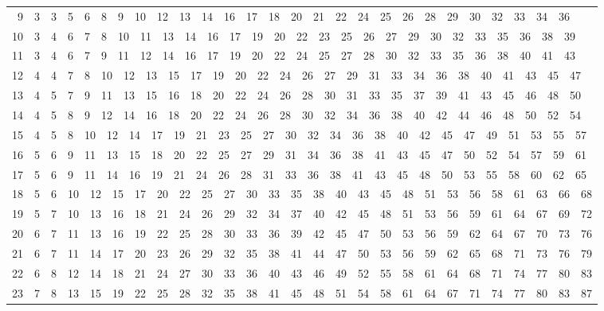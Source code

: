 \documentclass[11pt]{article}
\begin{document}
\begin{center}
\begin{tabular}{r|l}
            9 & 3~~\phantom{0}3~~\phantom{0}5~~\phantom{0}6~~\phantom{0}8~~\phantom{0}9~~10~~12~~13~~14~~16~~17~~18~~20~~21~~22~~24~~25~~26~~28~~29~~30~~32~~33~~34~~36 \\
            10 & 3~~\phantom{0}4~~\phantom{0}6~~\phantom{0}7~~\phantom{0}8~~10~~11~~13~~14~~16~~17~~19~~20~~22~~23~~25~~26~~27~~29~~30~~32~~33~~35~~36~~38~~39 \\
            11 & 3~~\phantom{0}4~~\phantom{0}6~~\phantom{0}7~~\phantom{0}9~~11~~12~~14~~16~~17~~19~~20~~22~~24~~25~~27~~28~~30~~32~~33~~35~~36~~38~~40~~41~~43 \\
            12 & 4~~\phantom{0}4~~\phantom{0}7~~\phantom{0}8~~10~~12~~13~~15~~17~~19~~20~~22~~24~~26~~27~~29~~31~~33~~34~~36~~38~~40~~41~~43~~45~~47 \\
            13 & 4~~\phantom{0}5~~\phantom{0}7~~\phantom{0}9~~11~~13~~15~~16~~18~~20~~22~~24~~26~~28~~30~~31~~33~~35~~37~~39~~41~~43~~45~~46~~48~~50 \\
            14 & 4~~\phantom{0}5~~\phantom{0}8~~\phantom{0}9~~12~~14~~16~~18~~20~~22~~24~~26~~28~~30~~32~~34~~36~~38~~40~~42~~44~~46~~48~~50~~52~~54 \\
            15 & 4~~\phantom{0}5~~\phantom{0}8~~10~~12~~14~~17~~19~~21~~23~~25~~27~~30~~32~~34~~36~~38~~40~~42~~45~~47~~49~~51~~53~~55~~57 \\
            16 & 5~~\phantom{0}6~~\phantom{0}9~~11~~13~~15~~18~~20~~22~~25~~27~~29~~31~~34~~36~~38~~41~~43~~45~~47~~50~~52~~54~~57~~59~~61 \\
            17 & 5~~\phantom{0}6~~\phantom{0}9~~11~~14~~16~~19~~21~~24~~26~~28~~31~~33~~36~~38~~41~~43~~45~~48~~50~~53~~55~~58~~60~~62~~65 \\
            18 & 5~~\phantom{0}6~~10~~12~~15~~17~~20~~22~~25~~27~~30~~33~~35~~38~~40~~43~~45~~48~~51~~53~~56~~58~~61~~63~~66~~68 \\
            19 & 5~~\phantom{0}7~~10~~13~~16~~18~~21~~24~~26~~29~~32~~34~~37~~40~~42~~45~~48~~51~~53~~56~~59~~61~~64~~67~~69~~72 \\
            20 & 6~~\phantom{0}7~~11~~13~~16~~19~~22~~25~~28~~30~~33~~36~~39~~42~~45~~47~~50~~53~~56~~59~~62~~64~~67~~70~~73~~76 \\
            21 & 6~~\phantom{0}7~~11~~14~~17~~20~~23~~26~~29~~32~~35~~38~~41~~44~~47~~50~~53~~56~~59~~62~~65~~68~~71~~73~~76~~79 \\
            22 & 6~~\phantom{0}8~~12~~14~~18~~21~~24~~27~~30~~33~~36~~40~~43~~46~~49~~52~~55~~58~~61~~64~~68~~71~~74~~77~~80~~83 \\
            23 & 7~~\phantom{0}8~~13~~15~~19~~22~~25~~28~~32~~35~~38~~41~~45~~48~~51~~54~~58~~61~~64~~67~~71~~74~~77~~80~~83~~87 \\

\end{tabular}
\end{center}
\end{document}

